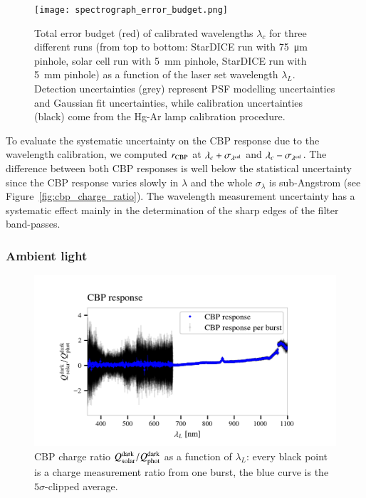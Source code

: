 \begin{figure}[!h]
\centering
\texttt{[image: spectrograph\_error\_budget.png]}
\caption{Total error budget (red) of calibrated wavelengths $\lambda_c$ for three different runs (from top to bottom: StarDICE run with \SI{75}{\um} pinhole, solar cell run with \SI{5}{mm} pinhole, StarDICE run with \SI{5}{mm} pinhole) as a function of the laser set wavelength $\lambda_L$. Detection uncertainties (grey) represent PSF modelling uncertainties and Gaussian fit uncertainties, while calibration uncertainties (black) come from the Hg-Ar lamp calibration procedure. }\label{fig:wavelength_error_budget}
\end{figure}

To evaluate the systematic uncertainty on the CBP response due to the wavelength calibration, we computed $r_{\rm CBP}$ at $\lambda_c+\sigma_{\lambda^{\rm cal}}$ and $\lambda_c-\sigma_{\lambda^{\rm cal}}$. The difference between both CBP responses is well below the statistical uncertainty since the CBP response varies slowly in $\lambda$ and the whole $\sigma_\lambda$ is sub-Angstrom (see Figure~\ref{fig:cbp_charge_ratio}). The wavelength measurement uncertainty has a systematic effect mainly in the determination of the sharp edges of the filter band-passes.



\subsubsection{Ambient light}\label{sec:sc_linearity}

\begin{figure}[h]
    \centering
    \includegraphics[width=\columnwidth]{fig/sc_dark_qswMAX.png}
    \caption{CBP charge ratio $Q_{\mathrm{solar}}^{\rm dark}/Q_{\mathrm{phot}}^{\rm dark}$ as a function of $\lambda_L$: every black point is a charge measurement ratio from one burst, the blue curve is the $5\sigma$-clipped average.}
    \label{fig:sc_dark}
\end{figure}

